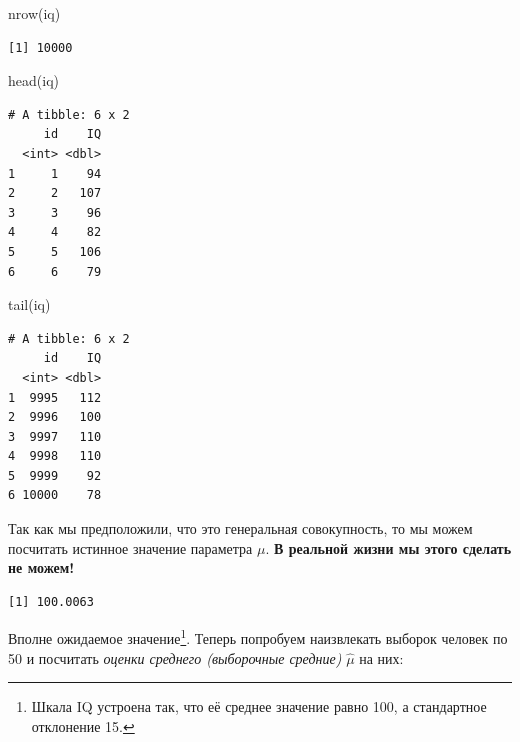 \documentclass[
  letterpaper,
]{scrbook}
\newenvironment{Shaded}{}{}
\newcommand{\FunctionTok}[1]{\textcolor[rgb]{0.44,0.26,0.76}{#1}}
\newcommand{\NormalTok}[1]{\textcolor[rgb]{0.14,0.16,0.18}{#1}}
\newcommand{\SpecialCharTok}[1]{\textcolor[rgb]{0.00,0.36,0.77}{#1}}
\theoremstyle{definition}
\theoremstyle{remark}
\begin{document}
\begin{Shaded}
\begin{Highlighting}[]
\FunctionTok{nrow}\NormalTok{(iq)}
\end{Highlighting}
\end{Shaded}

\begin{verbatim}
[1] 10000
\end{verbatim}

\begin{Shaded}
\begin{Highlighting}[]
\FunctionTok{head}\NormalTok{(iq)}
\end{Highlighting}
\end{Shaded}

\begin{verbatim}
# A tibble: 6 x 2
     id    IQ
  <int> <dbl>
1     1    94
2     2   107
3     3    96
4     4    82
5     5   106
6     6    79
\end{verbatim}

\begin{Shaded}
\begin{Highlighting}[]
\FunctionTok{tail}\NormalTok{(iq)}
\end{Highlighting}
\end{Shaded}

\begin{verbatim}
# A tibble: 6 x 2
     id    IQ
  <int> <dbl>
1  9995   112
2  9996   100
3  9997   110
4  9998   110
5  9999    92
6 10000    78
\end{verbatim}

Так как мы предположили, что это генеральная совокупность, то мы можем
посчитать истинное значение параметра \(\mu\). \textbf{В реальной жизни
мы этого сделать не можем!}

\begin{Shaded}
\end{Shaded}

\begin{verbatim}
[1] 100.0063
\end{verbatim}

Вполне ожидаемое значение\footnote{Шкала IQ устроена так, что её среднее
  значение равно 100, а стандартное отклонение 15.}. Теперь попробуем
наизвлекать выборок человек по 50 и посчитать \emph{оценки среднего
(выборочные средние)} \(\hat \mu\) на них:
\end{document}
